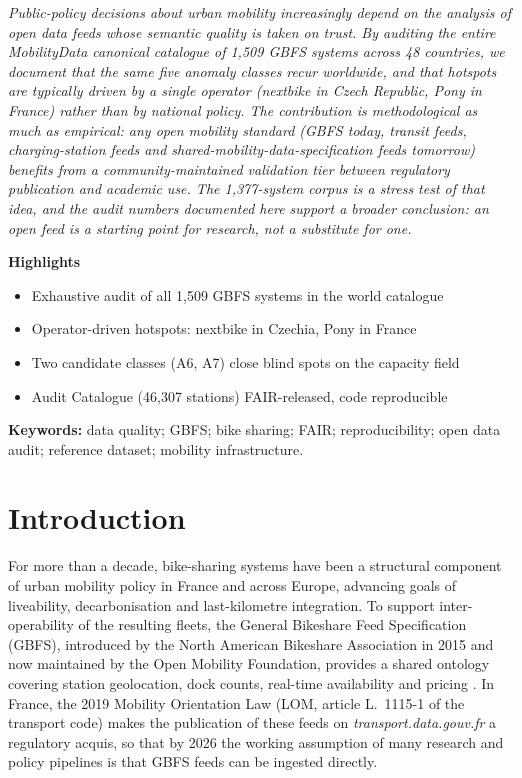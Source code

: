 \documentclass[11pt,a4paper]{article}
\newenvironment{highlights}{%
  \par\noindent\textsf{\bfseries\large Highlights}\par\smallskip
  \begin{itemize}[leftmargin=1.4em,itemsep=0.15em,topsep=0.2em]}{%
  \end{itemize}\par\medskip}
\begin{document}
\begin{bigpicture}\itshape
Public-policy decisions about urban mobility increasingly depend on
the analysis of open data feeds whose semantic quality is taken on
trust. By auditing the entire MobilityData canonical catalogue of 1{,}509
GBFS systems across 48 countries, we document that the same five
anomaly classes recur worldwide, and that hotspots are typically
driven by a single operator (nextbike in Czech Republic, Pony in
France) rather than by national policy. The contribution is methodological as much as
empirical: any open mobility standard (GBFS today, transit feeds,
charging-station feeds and shared-mobility-data-specification feeds
tomorrow) benefits from a community-maintained validation tier
between regulatory publication and academic use. The 1{,}377-system
corpus is a stress test of that idea, and the audit numbers
documented here support a broader conclusion: an open feed is a
starting point for research, not a substitute for one.
\end{bigpicture}

\begin{highlights}
\item Exhaustive audit of all 1{,}509 GBFS systems in the world catalogue
\item Operator-driven hotspots: nextbike in Czechia, Pony in France
\item Two candidate classes (A6, A7) close blind spots on the capacity field
\item Audit Catalogue (46{,}307 stations) FAIR-released, code reproducible
\end{highlights}

\noindent\textbf{Keywords:} data quality; GBFS; bike sharing; FAIR; reproducibility;
open data audit; reference dataset; mobility infrastructure.

\section{Introduction}\label{secIntro}

For more than a decade, bike-sharing systems have been a structural
component of urban mobility policy in France and across Europe, advancing
goals of liveability, decarbonisation and last-kilometre integration. To
support inter-operability of the resulting fleets, the General Bikeshare
Feed Specification (GBFS), introduced by the North American Bikeshare
Association in 2015 and now maintained by the Open Mobility Foundation,
provides a shared ontology covering station geolocation, dock counts,
real-time availability and pricing
\cite{Mobi2024,OMF2023}. In France, the 2019 Mobility Orientation Law
(LOM, article L.~1115-1 of the transport code) makes the publication of
these feeds on \emph{transport.data.gouv.fr} a regulatory acquis, so
that by 2026 the working assumption of many research and policy
pipelines is that GBFS feeds can be ingested directly.
\end{document}
